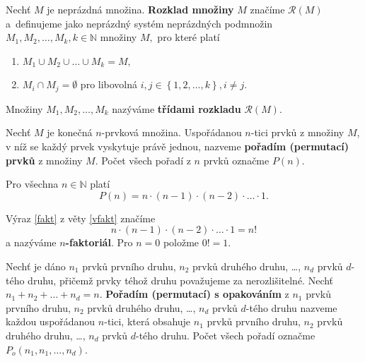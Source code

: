\begin{definition}
    Nechť $M$ je neprázdná množina. \textbf{Rozklad množiny} $M$ značíme
    $\mathscr R(M)$ a~definujeme jako neprázdný systém neprázdných podmnožin
    $M_1, M_2, \dots, M_k, k\in \mathbb N$ množiny $M,$ pro které platí
    \begin{enumerate}[$i.$]
    \item $M_1\cup M_2 \cup \dots \cup M_k = M,$
   	\item $M_i \cap M_j = \emptyset$ pro libovolná
    $i,j \in \left \{ 1,2,\dots,k \right \},i\ne j $.
    \end{enumerate}
    Množiny $M_1, M_2, \dots, M_k$ nazýváme \textbf{třídami rozkladu} $\mathscr R(M).$
\end{definition}

\begin{definition}
    Nechť $M$ je konečná $n$-prvková množina. Uspořádanou $n$-tici prvků z
    množiny $M$, v níž se každý prvek vyskytuje právě jednou, nazveme \textbf{pořadím
    (permutací) prvků} z množiny $M$. Počet všech pořadí z $n$ prvků označme $P(n).$
\end{definition}

\begin{veta}\label{vfakt}
    Pro všechna $n \in \mathbb N$ platí
    \begin{equation}\label{fakt}
   P(n)=n\cdot(n-1)\cdot(n-2)\cdot\hdots\cdot1.
    \end{equation}
\end{veta}

\begin{definition}
    Výraz \ref{fakt} z věty \ref{vfakt} značíme
    $$n\cdot(n-1)\cdot(n-2)\cdot\hdots\cdot1=n!$$
    a nazýváme \textbf{$n$-faktoriál}. Pro $n=0$ položme $0! =1.$
\end{definition}

\begin{definition}
    Nechť je dáno $n_1$ prvků prvního druhu, $n_2$ prvků druhého druhu, \dots,
    $n_d$ prvků $d$-tého druhu, přičemž prvky téhož druhu považujeme za nerozlišitelné.
    Nechť $n_1+n_2+\dots+n_d=n.$ \textbf{Pořadím (permutací) s opakováním} z  $n_1$
    prvků prvního druhu, $n_2$ prvků druhého druhu, \dots, $n_d$ prvků $d$-tého druhu
    nazveme každou uspořádanou $n$-tici, která obsahuje $n_1$ prvků prvního druhu,
    $n_2$ prvků druhého druhu, \dots, $n_d$ prvků $d$-tého druhu. Počet všech pořadí
    označme $P_o(n_1, n_1, \dots, n_d).$
\end{definition}

